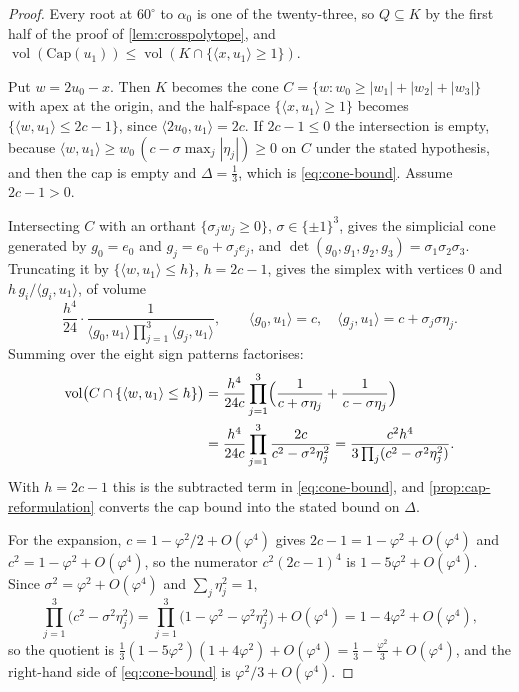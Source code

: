 \documentclass[11pt,reqno]{amsart}
\renewcommand{\_}{\origunderscore\allowbreak}
\numberwithin{equation}{section}
\theoremstyle{plain}
\theoremstyle{definition}
\theoremstyle{remark}
\newcommand{\tilt}{\varphi}                  %
\newcommand{\dev}{\eta}                      %
\newcommand{\defect}{\Delta}                 %
\newcommand{\base}{u}                        %
\newcommand{\capQ}{\mathrm{Cap}}             %
\DeclareMathOperator{\vol}{vol}
\begin{document}
\begin{proof}
Every root at $60^\circ$ to $\alpha_0$ is one of the twenty-three, so
$Q\subseteq K$ by the first half of the proof of
\cref{lem:crosspolytope}, and $\vol(\capQ(\base_1))\le\vol(K\cap\{\langle
x,\base_1\rangle\ge1\})$.

Put $w=2\base_0-x$. Then $K$ becomes the cone
$C=\{w:w_0\ge|w_1|+|w_2|+|w_3|\}$ with apex at the origin, and the
half-space $\{\langle x,\base_1\rangle\ge1\}$ becomes $\{\langle
w,\base_1\rangle\le2c-1\}$, since $\langle
2\base_0,\base_1\rangle=2c$. If $2c-1\le0$ the intersection is empty,
because $\langle w,\base_1\rangle\ge w_0\,(c-\sigma\max_j|\dev_j|)\ge0$
on $C$ under the stated hypothesis, and then the cap is empty and
$\defect=\tfrac13$, which is \eqref{eq:cone-bound}. Assume $2c-1>0$.

Intersecting $C$ with an orthant $\{\sigma_jw_j\ge0\}$, $\sigma\in\{\pm
1\}^3$, gives the simplicial cone generated by $g_0=e_0$ and
$g_j=e_0+\sigma_je_j$, and $\det(g_0,g_1,g_2,g_3)=\sigma_1\sigma_2\sigma_3$.
Truncating it by $\{\langle w,\base_1\rangle\le h\}$, $h=2c-1$, gives the
simplex with vertices $0$ and $h\,g_i/\langle g_i,\base_1\rangle$, of
volume
\[
  \frac{h^4}{24}\cdot\frac{1}{\langle g_0,\base_1\rangle
  \prod_{j=1}^{3}\langle g_j,\base_1\rangle},
  \qquad
  \langle g_0,\base_1\rangle=c,\quad
  \langle g_j,\base_1\rangle=c+\sigma_j\sigma\dev_j .
\]
Summing over the eight sign patterns factorises:
\[
\begin{aligned}
  \vol\bigl(C\cap\{\langle w,\base_1\rangle\le h\}\bigr)
  &=\frac{h^4}{24c}\prod_{j=1}^{3}
   \Bigl(\frac{1}{c+\sigma\dev_j}+\frac{1}{c-\sigma\dev_j}\Bigr)\\
  &=\frac{h^4}{24c}\prod_{j=1}^{3}\frac{2c}{c^2-\sigma^2\dev_j^2}
  =\frac{c^2h^4}{3\prod_j(c^2-\sigma^2\dev_j^2)} .
\end{aligned}
\]
With $h=2c-1$ this is the subtracted term in \eqref{eq:cone-bound}, and
\cref{prop:cap-reformulation} converts the cap bound into the stated
bound on $\defect$.

For the expansion, $c=1-\tilt^2/2+O(\tilt^4)$ gives $2c-1=1-\tilt^2+O(\tilt^4)$
and $c^2=1-\tilt^2+O(\tilt^4)$, so the numerator $c^2(2c-1)^4$ is
$1-5\tilt^2+O(\tilt^4)$. Since $\sigma^2=\tilt^2+O(\tilt^4)$ and
$\sum_j\dev_j^2=1$,
\[
  \prod_{j=1}^{3}\bigl(c^2-\sigma^2\dev_j^2\bigr)
  =\prod_{j=1}^{3}\bigl(1-\tilt^2-\tilt^2\dev_j^2\bigr)+O(\tilt^4)
  =1-4\tilt^2+O(\tilt^4),
\]
so the quotient is
$\tfrac13(1-5\tilt^2)(1+4\tilt^2)+O(\tilt^4)=\tfrac13-\tfrac{\tilt^2}{3}+O(\tilt^4)$,
and the right-hand side of \eqref{eq:cone-bound} is
$\tilt^2/3+O(\tilt^4)$.


\end{proof}
\end{document}
